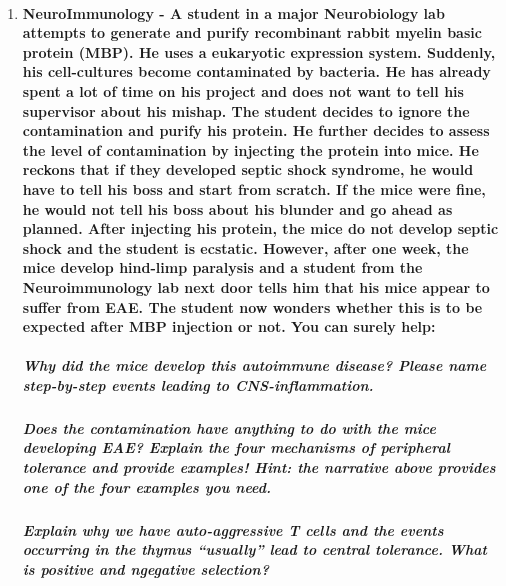 \documentclass[12pt,article,oneside,a4paper]{memoir}
\begin{document}
\begin{enumerate}
\item \paragraph{NeuroImmunology - A student in a major Neurobiology lab attempts to generate and purify recombinant rabbit myelin basic protein (MBP).  He uses a eukaryotic expression system.  Suddenly, his cell-cultures become contaminated by bacteria.  He has already spent a lot of time on his project and does not want to tell his supervisor about his mishap.  The student decides to ignore the contamination and purify his protein.  He further decides to assess the level of contamination by injecting the protein into mice.  He reckons that if they developed septic shock syndrome, he would have to tell his boss and start from scratch.  If the mice were fine, he would not tell his boss about his blunder and go ahead as planned. After injecting his protein, the mice do not develop septic shock and the student is ecstatic.  However, after one week, the mice develop hind-limp paralysis and a student from the Neuroimmunology lab next door tells him that his mice appear to suffer from EAE.  The student now wonders whether this is to be expected after MBP injection or not.  You can surely help:}
\subparagraph{Why did the mice develop this autoimmune disease?  Please name step-by-step events leading to CNS-inflammation.}
\subparagraph{Does the contamination have anything to do with the mice developing EAE?  Explain the four mechanisms of peripheral tolerance and provide examples!  Hint: the narrative above provides one of the four examples you need.}
\subparagraph{Explain why we have auto-aggressive T cells and the events occurring in the thymus “usually” lead to central tolerance.  What is positive and ngegative selection?}


\end{enumerate}
\end{document}

